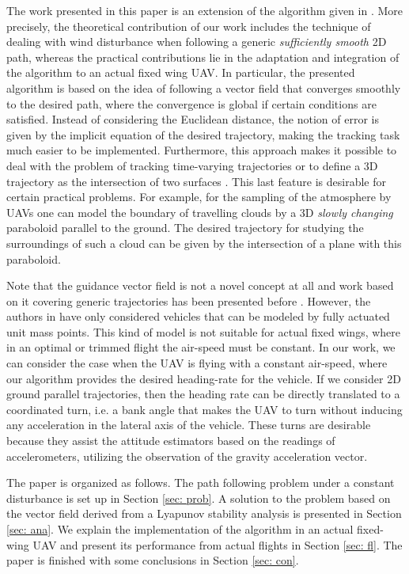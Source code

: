 \documentclass[letterpaper, 10 pt, conference]{ieeeconf}  %
\begin{document}
The work presented in this paper is an extension of the algorithm given in \cite{YuriCS}. More precisely, the theoretical contribution of our work includes the technique of dealing with wind disturbance when following a generic \emph{sufficiently smooth} 2D path, whereas the practical contributions lie in the adaptation and integration of the algorithm to an actual fixed wing UAV. In particular, the presented algorithm is based on the idea of following a vector field \cite{nelson2007vector,frew2007lyapunov} that converges smoothly to the desired path, where the convergence is global if certain conditions are satisfied. Instead of considering the Euclidean distance, the notion of error is given by the implicit equation of the desired trajectory, making the tracking task much easier to be implemented. Furthermore, this approach makes it possible to deal with the problem of tracking time-varying trajectories or to define a 3D trajectory as the intersection of two surfaces \cite{Wang}. This last feature is desirable for certain practical problems. For example, for the sampling of the atmosphere by UAVs \cite{skyscanner} one can model the boundary of travelling clouds by a 3D \emph{slowly changing} paraboloid parallel to the ground. The desired trajectory for studying the surroundings of such a cloud can be given by the intersection of a plane with this paraboloid.

Note that the guidance vector field is not a novel concept at all and work based on it covering generic trajectories has been presented before \cite{robot}. However, the authors in \cite{robot} have only considered vehicles that can be modeled by fully actuated unit mass points. This kind of model is not suitable for actual fixed wings, where in an optimal or trimmed flight the air-speed must be constant. In our work, we can consider the case when the UAV is flying with a constant air-speed, where our algorithm provides the desired heading-rate for the vehicle. If we consider 2D ground parallel trajectories, then the heading rate can be directly translated to a coordinated turn, i.e. a bank angle that makes the UAV to turn without inducing any acceleration in the lateral axis of the vehicle.  These turns are desirable because they assist the attitude estimators \cite{de2012uav,condomines2015pi} based on the readings of accelerometers, utilizing the observation of the gravity acceleration vector.

The paper is organized as follows. The path following problem under a constant disturbance is set up in Section \ref{sec: prob}. A solution to the problem based on the vector field derived from a Lyapunov stability analysis is presented in Section \ref{sec: ana}. We explain the implementation of the algorithm in an actual fixed-wing UAV and present its performance from actual flights in Section \ref{sec: fl}. The paper is finished with some conclusions in Section \ref{sec: con}.
\end{document}
